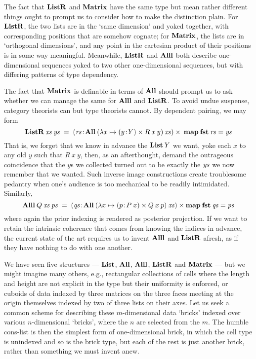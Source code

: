 \documentclass{article}
\begin{document}
The fact that $\mathbf{ListR}$ and $\mathbf{Matrix}$ have the same type but mean rather different things ought to prompt us to consider how to make the distinction plain. For $\mathbf{ListR}$, the two lists are in the `same dimension' and yoked together, with corresponding positions that are somehow cognate; for $\mathbf{Matrix}$, the lists are in `orthogonal dimensions', and any point in the cartesian product of their positions is in some way meaningful. Meanwhile, $\mathbf{ListR}$ and $\mathbf{Alll}$ both describe one-dimensional sequences yoked to two other one-dimensional sequences, but with differing patterns of type dependency.

The fact that $\mathbf{Matrix}$ is definable in terms of $\mathbf{All}$ should prompt us to ask whether we can manage the same for $\mathbf{Alll}$ and $\mathbf{ListR}$. To avoid undue suspense, category theorists can but type theorists cannot. By dependent pairing, we may form
\[
\mathbf{ListR}\:\mathit{xs}\:\mathit{ys} \;=\; (\mathit{rs}\!:\!\mathbf{All}\:(\lambda x\mapsto (y\!:\! Y)\times R\:x\:y)\:\mathit{xs})\times\:\mathbf{map}\:\mathbf{fst}\:\mathit{rs} = \mathit{ys}
\]
That is, we forget that we know in advance the $\mathbf{List}\:Y$ we want, yoke each $x$ to any old $y$ such that $R\:x\:y$, then, as an afterthought, demand the outrageous coincidence that the $y$s we collected turned out to be exactly the $\mathit{ys}$ we now remember that we wanted. Such inverse image constructions create troublesome pedantry when one's audience is too mechanical to be readily intimidated. Similarly,
\[
\mathbf{Alll}\:Q\:\mathit{xs}\:\mathit{ps} \;=\; (\mathit{qs}\!:\!\mathbf{All}\:(\lambda x\mapsto (p\!:\! P\:x)\times Q\:x\:p)\:\mathit{xs}) \times \mathbf{map}\:\mathbf{fst}\:\mathit{qs} = \mathit{ps}
\]
where again the prior indexing is rendered as posterior projection. If we want to retain the intrinsic coherence that comes from knowing the indices in advance, the current state of the art requires us to invent $\mathbf{Alll}$ and $\mathbf{ListR}$ afresh, as if they have nothing to do with one another.

We have seen five structures --- $\mathbf{List}$, $\mathbf{All}$, $\mathbf{Alll}$, $\mathbf{ListR}$ and $\mathbf{Matrix}$ --- but we might imagine many others, e.g., rectangular collections of cells where the length and height are not explicit in the type but their uniformity is enforced, or cuboids of data indexed by three matrices on the three faces meeting at the origin themselves indexed by two of three lists on their axes. Let us seek a common scheme for describing these $m$-dimensional data `bricks' indexed over various $n$-dimensional `bricks', where the $n$ are selected from the $m$. The humble cons-list is then the simplest form of one-dimensional brick, in which the cell type is unindexed and so is the brick type, but each of the rest is just another brick, rather than something we must invent anew.
\end{document}
